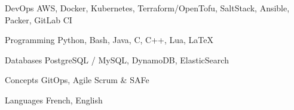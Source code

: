 

\begin{cvskills}

  \cvskill
    {DevOps} %
    {AWS, Docker, Kubernetes, Terraform/OpenTofu, SaltStack, Ansible, Packer, GitLab CI} %

  \cvskill
    {Programming} %
    {Python, Bash, Java, C, C++, Lua, LaTeX} %

  \cvskill
    {Databases} %
    {PostgreSQL / MySQL, DynamoDB, ElasticSearch} %

  \cvskill
    {Concepts} %
    {GitOps, Agile Scrum \& SAFe} %

  \cvskill
    {Languages} %
    {French, English} %

\end{cvskills}
